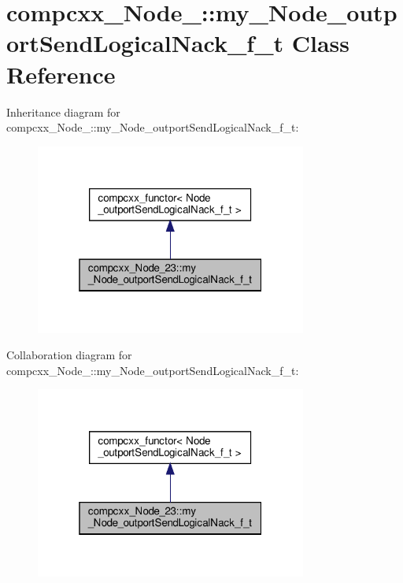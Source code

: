 \hypertarget{classcompcxx__Node__23_1_1my__Node__outportSendLogicalNack__f__t}{}\section{compcxx\+\_\+\+Node\+\_\+:\+:my\+\_\+\+Node\+\_\+outport\+Send\+Logical\+Nack\+\_\+f\+\_\+t Class Reference}
\label{classcompcxx__Node__23_1_1my__Node__outportSendLogicalNack__f__t}


Inheritance diagram for compcxx\+\_\+\+Node\+\_\+:\+:my\+\_\+\+Node\+\_\+outport\+Send\+Logical\+Nack\+\_\+f\+\_\+t\+:\nopagebreak
\begin{figure}[H]
\begin{center}
\leavevmode
\includegraphics[width=253pt]{classcompcxx__Node__23_1_1my__Node__outportSendLogicalNack__f__t__inherit__graph}
\end{center}
\end{figure}


Collaboration diagram for compcxx\+\_\+\+Node\+\_\+:\+:my\+\_\+\+Node\+\_\+outport\+Send\+Logical\+Nack\+\_\+f\+\_\+t\+:\nopagebreak
\begin{figure}[H]
\begin{center}
\leavevmode
\includegraphics[width=253pt]{classcompcxx__Node__23_1_1my__Node__outportSendLogicalNack__f__t__coll__graph}
\end{center}
\end{figure}

